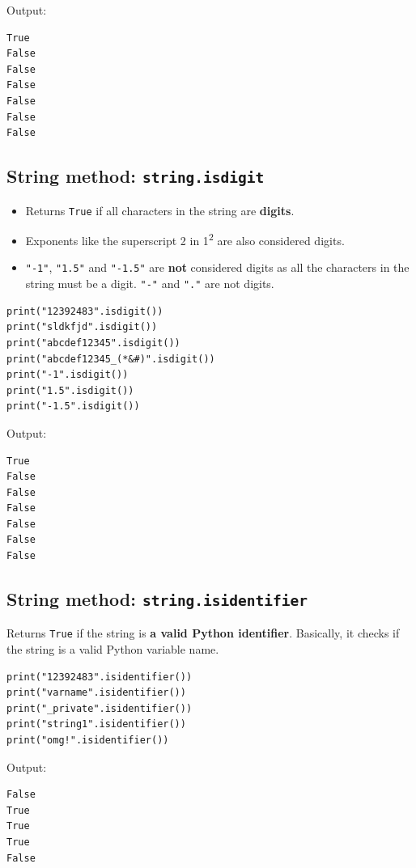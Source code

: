 \documentclass[11pt]{article}
\begin{document}
 \noindent Output:

\begin{verbatim}
True
False
False
False
False
False
False
\end{verbatim}


 \newpage

\subsection{String method: \texttt{string.isdigit}}
\label{sec:org9254ffd}
\begin{itemize}
\item Returns \texttt{True} if all characters in the string are \textbf{digits}.
\item Exponents like the superscript 2 in 1\textsuperscript{2} are also considered digits.
\item \texttt{"-1"}, \texttt{"1.5"} and \texttt{"-1.5"} are \textbf{not} considered digits as all the characters in the string must be a digit. \texttt{"-"} and \texttt{"."} are not digits.
\end{itemize}

\begin{verbatim}
print("12392483".isdigit())
print("sldkfjd".isdigit())
print("abcdef12345".isdigit())
print("abcdef12345_(*&#)".isdigit())
print("-1".isdigit())
print("1.5".isdigit())
print("-1.5".isdigit())
\end{verbatim}

 \noindent Output:

\begin{verbatim}
True
False
False
False
False
False
False
\end{verbatim}

\subsection{String method: \texttt{string.isidentifier}}
\label{sec:orgcc04c92}
Returns \texttt{True} if the string is \textbf{a valid Python identifier}. Basically, it checks if the string is a valid Python variable name.

\begin{verbatim}
print("12392483".isidentifier())
print("varname".isidentifier())
print("_private".isidentifier())
print("string1".isidentifier())
print("omg!".isidentifier())
\end{verbatim}

 \noindent Output:

\begin{verbatim}
False
True
True
True
False
\end{verbatim}
\end{document}

